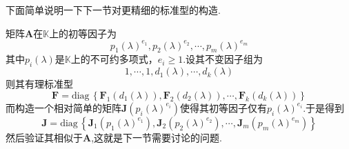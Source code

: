 下面简单说明一下下一节对更精细的标准型的构造.

矩阵$\bm{A}$在$\mathbb{K}$上的初等因子为\[
    p_1\left(\lambda\right)^{e_1},p_2\left(\lambda\right)^{e_2},\cdots,p_m\left(\lambda\right)^{e_m}
\]其中$p_i\left(\lambda\right)$是$\mathbb{K}$上的不可约多项式，$e_i\geqslant 1.$设其不变因子组为\[
    1,\cdots,1,d_1\left(\lambda\right),\cdots,d_k\left(\lambda\right)
\]则其有理标准型\[
    \bm{F}=\mathrm{diag}\,\left\{
    \bm{F}_1\left(d_1\left(\lambda\right)\right),\bm{F}_2\left(d_2\left(\lambda\right)\right),\cdots,\bm{F}_k\left(d_k\left(\lambda\right)\right)
    \right\}
\]而构造一个相对简单的矩阵$\bm{J}\left(p_i\left(\lambda\right)^{e_i}\right)$使得其初等因子仅有$p_i\left(\lambda\right)^{e_i}$.于是得到
\[
    \bm{J}=\mathrm{diag}\,\left\{
    \bm{J}_1\left(p_1\left(\lambda\right)^{e_1}\right),\bm{J}_2\left(p_2\left(\lambda\right)^{e_2}\right),\cdots,\bm{J}_m\left(p_m\left(\lambda\right)^{e_m}\right)
    \right\}
\]然后验证其相似于$\bm{A}$,这就是下一节需要讨论的问题.
